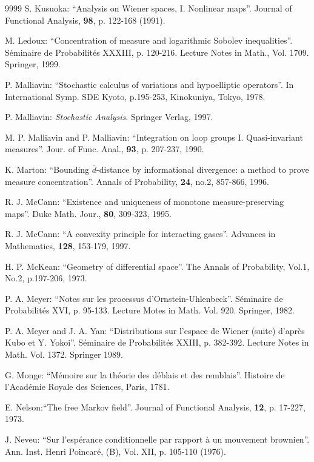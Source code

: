 \documentclass[12pt,a4paper]{book}
\begin{document}
\begin{thebibliography}{9999}
S. Kusuoka: ``Analysis on Wiener spaces, I. Nonlinear maps''. Journal
of Functional Analysis, {\bf 98}, p. 122-168 (1991).

M. Ledoux: ``Concentration of measure and logarithmic Sobolev
inequalities''. S\'eminaire de Probabilit\'es XXXIII, p. 120-216.
Lecture Notes in Math., Vol. 1709. Springer, 1999.

 P. Malliavin: ``Stochastic calculus of variations and
hypoelliptic operators''. In International Symp. SDE Kyoto, p.195-253,
Kinokuniya, Tokyo, 1978.

 P. Malliavin: {\sl  Stochastic Analysis}. Springer
  Verlag, 1997.



M. P. Malliavin and P. Malliavin: ``Integration on loop
  groups I. Quasi-invariant measures''. Jour. of Func. Anal., {\bf 93},
p. 207-237, 1990.

K. Marton: ``Bounding $\bar{d}$-distance by informational divergence:
a method to prove measure concentration''. Annals of Probability, {\bf
  24}, no.2, 857-866, 1996.


R. J. McCann: ``Existence and uniqueness of monotone measure-preserving
maps''. Duke Math. Jour., {\bf 80}, 309-323, 1995.

R. J. McCann: ``A convexity principle for interacting
gases''. Advances in Mathematics, {\bf 128}, 153-179, 1997.

H. P. McKean: ``Geometry of differential space''. The
  Annals of Probability, Vol.1, No.2, p.197-206, 1973.

P. A. Meyer: ``Notes sur les processus d'Ornstein-Uhlenbeck''.
 S\'eminaire de Probabilit\'es XVI, p. 95-133. Lecture Motes in Math.
Vol. 920. Springer, 1982.

P. A. Meyer and J. A. Yan: ``Distributions sur l'espace
  de Wiener (suite) d'apr\`es Kubo et Y. Yokoi''.  S\'eminaire de
  Probabilit\'es XXIII, p. 382-392. Lecture Notes in
  Math. Vol. 1372. Springer 1989.

G. Monge: ``M\'emoire sur la th\'eorie des d\'eblais et des
remblais''. Histoire de l'Acad\'emie Royale des Sciences, Paris, 1781.


E. Nelson:``The free Markov field''. Journal of
  Functional Analysis, {\bf 12}, p. 17-227, 1973.

J. Neveu: ``Sur l'esp\'erance conditionnelle par rapport
\`a un mouvement brownien''. Ann. Inst. Henri Poincar\'e, (B), Vol. XII,
p. 105-110 (1976).


\end{thebibliography}
\end{document}
